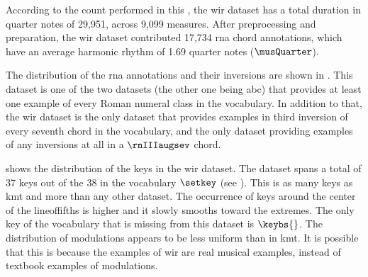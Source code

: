 
According to the count performed in this \thesisdiss{}, the
\gls{wir} dataset has a total duration in quarter notes of
29,951, across 9,099 measures. After preprocessing and
preparation, the \gls{wir} dataset contributed 17,734
\gls{rna} chord annotations, which have an average harmonic
rhythm of 1.69 quarter notes ($\musQuarter$).

The distribution of the \gls{rna} annotations and their
inversions are shown in . This
dataset is one of the two datasets (the other one being
\gls{abc}) that provides at least one example of every Roman
numeral class in the vocabulary. In addition to that, the
\gls{wir} dataset is the only dataset that provides examples
in third inversion of every seventh chord in the vocabulary,
and the only dataset providing examples of any inversions at
all in a $\rnIIIaugsev$ chord.



 shows the distribution of the keys
in the \gls{wir} dataset. The dataset spans a total of 37
keys out of the 38 in the vocabulary $\setkey$ (see
). This is as many keys
as \gls{kmt} and more than any other dataset. The occurrence
of keys around the center of the \gls{lineoffifths} is
higher and it slowly smooths toward the extremes. The only
key of the vocabulary that is missing from this dataset is
$\keybs{}$. The distribution of modulations appears to be
less uniform than in \gls{kmt}. It is possible that this is
because the examples of \gls{wir} are real musical examples,
instead of textbook examples of modulations.
